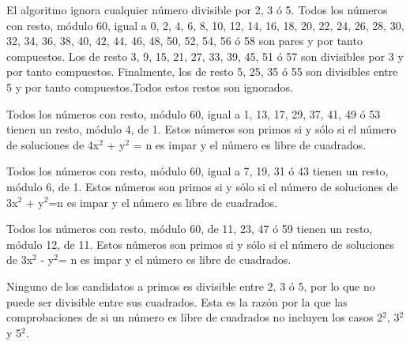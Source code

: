 El algoritmo ignora cualquier número divisible por 2, 3 ó 5. Todos los números con resto, módulo 60, igual a 0, 2, 4, 6, 8, 10, 12, 14, 16, 18, 20, 22, 24, 26, 28, 30, 32, 34, 36, 38, 40, 42, 44, 46, 48, 50, 52, 54, 56 ó 58 son pares y por tanto compuestos. Los de resto 3, 9, 15, 21, 27, 33, 39, 45, 51 ó 57 son divisibles por 3 y por tanto compuestos. Finalmente, los de resto 5, 25, 35 ó 55 son divisibles entre 5 y por tanto compuestos.Todos estos restos son ignorados.

Todos los números con resto, módulo 60, igual a 1, 13, 17, 29, 37, 41, 49 ó 53 tienen un resto, módulo 4, de 1. Estos números son primos si y sólo si el número de soluciones de 4x$^{2}$ + y$^{2}$ = n es impar y el número es libre de cuadrados.

Todos los números con resto, módulo 60, igual a 7, 19, 31 ó 43 tienen un resto, módulo 6, de 1. Estos números son primos si y sólo si el número de soluciones de 3x$^{2}$ + y$^{2}$=n es impar y el número es libre de cuadrados.

Todos los números con resto, módulo 60, de 11, 23, 47 ó 59 tienen un resto, módulo 12, de 11. Estos números son primos si y sólo si el número de soluciones de 3x$^{2}$ - y$^{2}$= n es impar y el número es libre de cuadrados.

Ninguno de los candidatos a primos es divisible entre 2, 3 ó 5, por lo que no puede ser divisible entre sus cuadrados. Esta es la razón por la que las comprobaciones de si un número es libre de cuadrados no incluyen los casos 2$^{2}$, 3$^{2}$ y 5$^{2}$.
